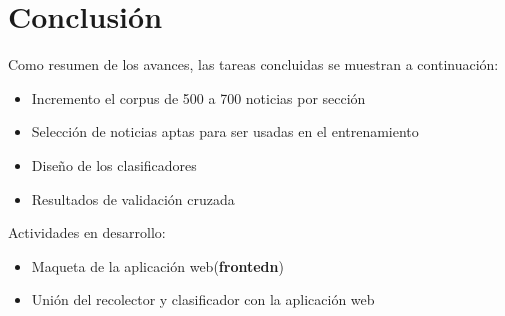 \section{Conclusión}

Como resumen de los avances, las tareas concluidas se muestran a continuación:

\begin{itemize}
	\item Incremento el corpus de 500 a 700 noticias por sección
	\item Selección de noticias aptas para ser usadas en el entrenamiento
	\item Diseño de los clasificadores		
	\item Resultados de validación cruzada
\end{itemize}

Actividades en desarrollo:

\begin{itemize}
	\item Maqueta de la aplicación web(\textbf{frontedn})
	\item Unión del recolector y clasificador con la aplicación web
\end{itemize}

